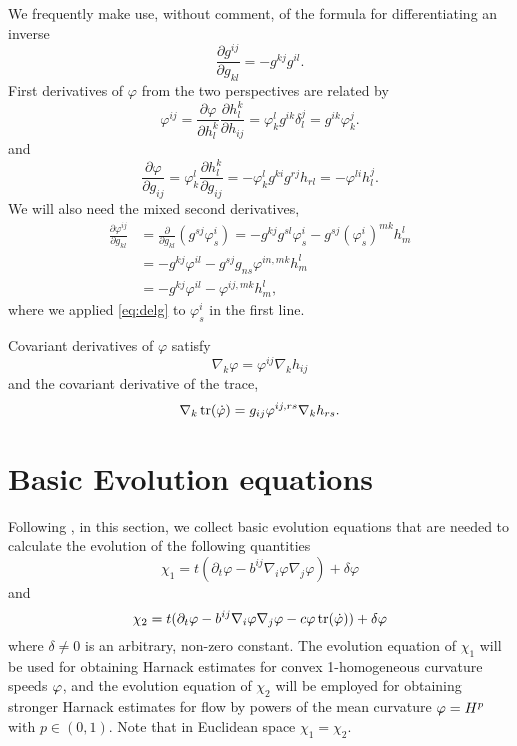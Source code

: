\documentclass{amsart}
\begin{document}
We frequently make use, without comment, of the formula for differentiating an inverse
\[
\frac{\partial g^{ij}}{\partial g_{kl}} = - g^{kj} g^{il}.
\]
First derivatives of \(\varphi\) from the two perspectives are related by
\begin{equation}
\label{eq:delh}
\varphi^{ij} = \frac{\partial \varphi}{\partial h_l^k} \frac{\partial h_l^k}{\partial h_{ij}} = \varphi^l_k g^{ik} \delta^j_l = g^{ik} \varphi^j_k.
\end{equation}
and
\begin{equation}
\label{eq:delg}
\frac{\partial\varphi}{\partial g_{ij}} = \varphi^{l}_{k} \frac{\partial h^{k}_{l}}{\partial g_{ij}} = -\varphi^{l}_{k} g^{ki} g^{rj} h_{rl} = -\varphi^{li}h^{j}_{l}.
\end{equation}
We will also need the mixed second derivatives,
\begin{equation}
\label{eq:delhdelg}
\begin{split}
\frac{\partial \varphi^{ij}}{\partial g_{kl}} &= \frac{\partial}{\partial g_{kl}} \left(g^{sj} \varphi^{i}_{s} \right) = - g^{kj}g^{sl} \varphi^{i}_{s} - g^{sj} (\varphi^i_s)^{mk} h^l_m \\
&= - g^{kj} \varphi^{il} - g^{sj} g_{ns} \varphi^{in,mk} h^l_m \\
&= - g^{kj} \varphi^{il} - \varphi^{ij,mk} h^l_m,
\end{split}
\end{equation}
where we applied \cref{eq:delg} to \(\varphi^i_s\) in the first line.

Covariant derivatives of \(\varphi\) satisfy
\begin{equation}
\label{eq:delphi}
\nabla_k \varphi = \varphi^{ij} \nabla_k h_{ij}
\end{equation}
and the covariant derivative of the trace,
\begin{equation}
\label{eq:delPhi}
\nabla_k \operatorname{tr}(\dot{\varphi}) = g_{ij} \varphi^{ij,rs} \nabla_k h_{rs}.
\end{equation}

\section{Basic Evolution equations}
\label{sec:basic_evolution}

Following \cite{MR1296393, MR1100812, MR1316556, MR1480081}, in this section, we collect basic evolution equations that are needed to calculate the evolution of the following quantities
\[
\chi_1 =t(\partial_t \varphi- b^{ij} \nabla_i \varphi \nabla_j \varphi) +\delta\varphi
\]
and
\[
\chi_2 =t(\partial_t \varphi - b^{ij} \nabla_i \varphi \nabla_j \varphi - c \varphi \operatorname{tr}(\dot{\varphi})) +\delta\varphi
\]
where \(\delta \ne 0\) is an arbitrary, non-zero constant. The evolution equation of $\chi_1$ will be used for obtaining Harnack estimates for convex 1-homogeneous curvature speeds $\varphi$, and the evolution equation of $\chi_2$ will be employed for obtaining stronger Harnack estimates for flow by powers of the mean curvature $\varphi=H^{p}$ with $p\in(0,1).$ Note that in Euclidean space $\chi_1=\chi_2.$
\end{document}
